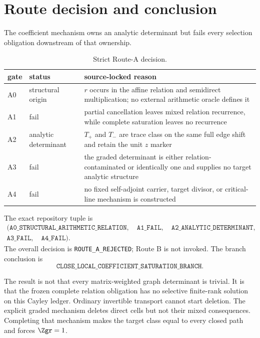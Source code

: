 \section{Route decision and conclusion}
\label{sec:conclusion}

The coefficient mechanism owns an analytic determinant but fails every
selection obligation downstream of that ownership.

\begin{table}[H]
\centering
\small
\begin{tabularx}{\textwidth}{@{}lL{0.20\textwidth}Y@{}}
\toprule
gate & status & source-locked reason \\
\midrule
A0 & structural origin & $r$ occurs in the affine relation and semidirect
multiplication; no external arithmetic oracle defines it \\
A1 & fail & partial cancellation leaves mixed relation recurrence, while
complete saturation leaves no recurrence \\
A2 & analytic determinant & $T_+$ and $T_-$ are trace class on the same full
edge shift and retain the unit $z$ marker \\
A3 & fail & the graded determinant is either relation-contaminated or
identically one and supplies no target analytic structure \\
A4 & fail & no fixed self-adjoint carrier, target divisor, or critical-line
mechanism is constructed \\
\bottomrule
\end{tabularx}
\caption{Strict Route-A decision.}
\label{tab:route}
\end{table}

The exact repository tuple is
\[
\begin{gathered}
(\texttt{A0\_STRUCTURAL\_ARITHMETIC\_RELATION},\quad
 \texttt{A1\_FAIL},\quad
 \texttt{A2\_ANALYTIC\_DETERMINANT},\\
 \texttt{A3\_FAIL},\quad
 \texttt{A4\_FAIL}).
\end{gathered}
\]
The overall decision is \texttt{ROUTE\_A\_REJECTED}; Route B is not invoked.
The branch conclusion is
\[
  \boxed{\texttt{CLOSE\_LOCAL\_COEFFICIENT\_SATURATION\_BRANCH}.}
\]

The result is not that every matrix-weighted graph determinant is trivial.
It is that the frozen complete relation obligation has no selective
finite-rank solution on this Cayley ledger.  Ordinary invertible transport
cannot start deletion.  The explicit graded mechanism deletes direct cells
but not their mixed consequences.  Completing that mechanism makes the
target class equal to every closed path and forces $\Zgr=1$.

